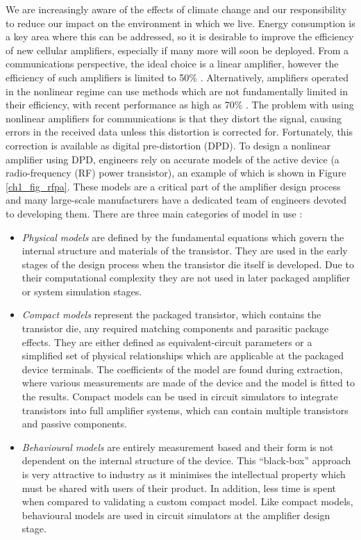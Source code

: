 \documentclass[../thesis/thesis.tex]{subfiles}
\begin{document}
\begin{refsection}
We are increasingly aware of the effects of climate change and our responsibility to reduce our impact on the environment in which we live. Energy consumption is a key area where this can be addressed, so it is desirable to improve the efficiency of new cellular amplifiers, especially if many more will soon be deployed. From a communications perspective, the ideal choice is a linear amplifier, however the efficiency of such amplifiers is limited to 50\% \cite{Cripps_2006}. Alternatively, amplifiers operated in the nonlinear regime can use methods which are not fundamentally limited in their efficiency, with recent performance as high as 70\% \cite{Kosaka_2016,Bhardwaj_2019}. The problem with using nonlinear amplifiers for communications is that they distort the signal, causing errors in the received data unless this distortion is corrected for. Fortunately, this correction is available as digital pre-distortion (DPD). To design a nonlinear amplifier using DPD, engineers rely on accurate models of the active device (a radio-frequency (RF) power transistor), an example of which is shown in Figure \ref{ch1_fig_rfpa}. These models are a critical part of the amplifier design process and many large-scale manufacturers have a dedicated team of engineers devoted to developing them. There are three main categories of model in use \cite{Aaen_2007}:

\begin{itemize}
	\item \emph{Physical models} are defined by the fundamental equations which govern the internal structure and materials of the transistor. They are used in the early stages of the design process when the transistor die itself is developed. Due to their computational complexity they are not used in later packaged amplifier or system simulation stages.
	\item \emph{Compact models} represent the packaged transistor, which contains the transistor die, any required matching components and parasitic package effects. They are either defined as equivalent-circuit parameters or a simplified set of physical relationships which are applicable at the packaged device terminals. The coefficients of the model are found during extraction, where various measurements are made of the device and the model is fitted to the results. Compact models can be used in circuit simulators to integrate transistors into full amplifier systems, which can contain multiple transistors and passive components.
	\item \emph{Behavioural models} are entirely measurement based and their form is not dependent on the internal structure of the device. This ``black-box'' approach is very attractive to industry as it minimises the intellectual property which must be shared with users of their product. In addition, less time is spent when compared to validating a custom compact model. Like compact models, behavioural models are used in circuit simulators at the amplifier design stage.
\end{itemize}


\end{refsection}
\end{document}
